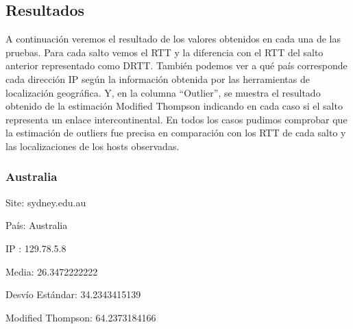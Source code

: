 \subsection{Resultados}

A continuación veremos el resultado de los valores obtenidos en cada una de las pruebas. Para cada salto vemos el RTT y la diferencia con el RTT del salto anterior representado como DRTT. También podemos ver a qué país corresponde cada dirección IP según la información obtenida por las herramientas de localización geográfica. Y, en la columna “Outlier”, se muestra el resultado obtenido de la estimación Modified Thompson indicando en cada caso si el salto representa un enlace intercontinental.
En todos los casos pudimos comprobar que la estimación de outliers fue precisa en comparación con los RTT de cada salto y las localizaciones de los hosts observadas.

\subsubsection{Australia}

Site: sydney.edu.au

País: Australia

IP : 129.78.5.8

Media: 26.3472222222 

Desvío Estándar: 34.2343415139 

Modified Thompson: 64.2373184166

